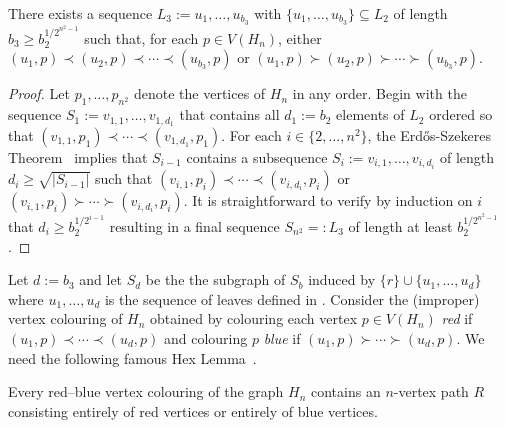 \documentclass[kpfonts]{patmorin}
\renewcommand{\ge}{\geqslant}
\begin{document}
\begin{lem}
    There exists a sequence $L_3:=u_1,\ldots,u_{b_3}$ with $\{u_1,\ldots,u_{b_3}\}\subseteq L_2$ of length $b_3\ge b_2^{1/2^{n^2-1}}$ such that, for each $p\in V(H_n)$, either  $(u_1,p)\prec (u_2,p)\prec\cdots\prec (u_{b_3},p)$ or $(u_1,p)\succ (u_2,p)\succ\cdots\succ (u_{b_3},p)$.
\end{lem}

\begin{proof}
    Let $p_1,\ldots,p_{n^2}$ denote the vertices of $H_n$ in any order.
    Begin with the sequence $S_1:=v_{1,1},\ldots,v_{1,d_1}$ that contains all $d_1:=b_2$ elements of $L_2$ ordered so that $(v_{1,1},p_1)\prec\cdots\prec(v_{1,d_1},p_1)$.  For each $i\in\{2,\ldots,n^2\}$, the Erd\H{o}s-Szekeres Theorem~\citep{ES35} implies that $S_{i-1}$ contains a subsequence $S_i:=v_{i,1},\ldots,v_{i,d_i}$ of length $d_i\ge \sqrt{|S_{i-1}|}$ such that $(v_{i,1},p_i)\prec\cdots\prec(v_{i,d_i},p_i)$ or $(v_{i,1},p_i)\succ\cdots\succ(v_{i,d_i},p_i)$.  It is straightforward to verify by induction on $i$ that $d_i \ge b_2^{1/2^{i-1}}$ resulting in a final sequence $S_{n^2}=:L_3$ of length at least $b_2^{1/2^{n^2-1}}$.
\end{proof}


Let $d:=b_3$ and let $S_d$ be the the subgraph of $S_b$ induced by $\{r\}\cup\{u_1,\ldots,u_{d}\}$ where $u_1,\ldots,u_d$ is the sequence of leaves defined in .  Consider the (improper) vertex colouring of $H_n$ obtained by colouring each vertex $p\in V(H_n)$ \emph{red} if $(u_1,p)\prec\cdots\prec (u_d,p)$ and colouring $p$ \emph{blue} if $(u_1,p)\succ\cdots\succ(u_d,p)$. We need the following famous Hex Lemma~\citep{Gale79}.

\begin{lem} \label{hex_lemma}
Every red--blue vertex colouring of the graph $H_n$	contains an $n$-vertex path $R$ consisting entirely of red vertices or entirely of blue vertices.
\end{lem}
\end{document}
